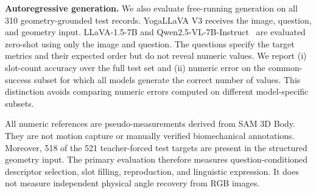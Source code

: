 \noindent\textbf{Autoregressive generation.}
We also evaluate free-running generation on all 310 geometry-grounded test records.
YogaLLaVA V3 receives the image, question, and geometry input.
LLaVA-1.5-7B and Qwen2.5-VL-7B-Instruct~\cite{bai2025qwen25vl} are evaluated zero-shot using only the image and question.
The questions specify the target metrics and their expected order but do not reveal numeric values.
We report (i) slot-count accuracy over the full test set and (ii) numeric error on the common-success subset for which all models generate the correct number of values.
This distinction avoids comparing numeric errors computed on different model-specific subsets.

All numeric references are pseudo-measurements derived from SAM 3D Body.
They are not motion capture or manually verified biomechanical annotations.
Moreover, 518 of the 521 teacher-forced test targets are present in the structured geometry input.
The primary evaluation therefore measures question-conditioned descriptor selection, slot filling, reproduction, and linguistic expression.
It does not measure independent physical angle recovery from RGB images.
